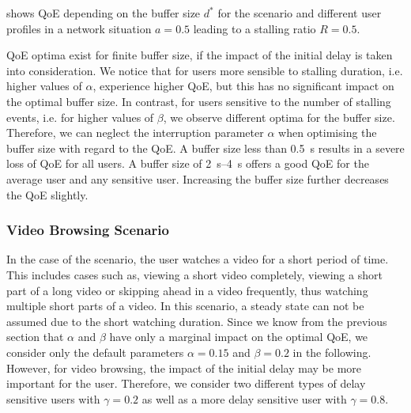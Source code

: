  shows \gls{QoE} depending on the buffer size \(d^*\) for the \watchNow scenario and different user profiles in a network situation \(a=0.5\) leading to a stalling ratio \(R=0.5\).

\gls{QoE} optima exist for finite buffer size, if the impact of the initial delay is taken into consideration. 
We notice that for users more sensible to stalling duration, i.e. higher values of \(\alpha\), experience higher \gls{QoE}, but this has no significant impact on the optimal buffer size.
In contrast, for users sensitive to the number of stalling events, i.e. for higher values of \(\beta\), we observe different optima for the buffer size.
Therefore, we can neglect the interruption parameter \(\alpha\) when optimising the buffer size with regard to the \gls{QoE}.
A buffer size less than \SI{0.5}{\second} results in a severe loss of \gls{QoE} for all users.
A buffer size of \SIrange{2}{4}{\second} offers a good \gls{QoE} for the average user and any sensitive user.
Increasing the buffer size further decreases the \gls{QoE} slightly.

\subsubsection*{Video Browsing Scenario}\label{sec:application:qoe_user_behaviour:typical_user_scenarios:browsing}

In the case of the \videoBrowsing scenario, the user watches a video for a short period of time. This includes cases such as, viewing a short video completely, viewing a short part of a long video or skipping ahead in a video frequently, thus watching multiple short parts of a video.
In this scenario, a steady state can not be assumed due to the short watching duration.
Since we know from the previous section that \(\alpha\) and \(\beta\) have only a marginal impact on the optimal \gls{QoE}, we consider only the default parameters \(\alpha=0.15\) and \(\beta=0.2\) in the following.
However, for video browsing, the impact of the initial delay may be more important for the user. Therefore, we consider two different types of delay sensitive users with \(\gamma=0.2\) as well as a more delay sensitive user with \(\gamma=0.8\).

